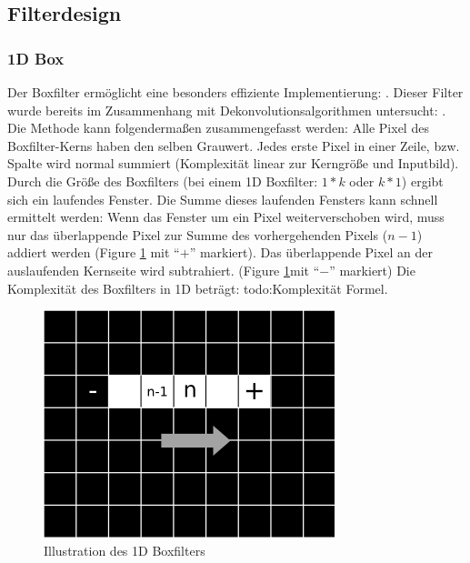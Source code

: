 \documentclass[a4paper,12pt]{article}
\begin{document}
\newpage

\subsection{Filterdesign}\label{chp:filterdesign}
\subsubsection{1D Box}\label{chp:1dBox}
Der Boxfilter ermöglicht eine besonders effiziente Implementierung:
\cite{mcdonnell}. Dieser Filter wurde bereits im Zusammenhang
mit Dekonvolutionsalgorithmen untersucht: \cite{vimpaper}.
Die Methode kann folgendermaßen zusammengefasst werden:
Alle Pixel des Boxfilter-Kerns haben den selben Grauwert. Jedes erste Pixel in
einer Zeile, bzw. Spalte wird normal summiert (Komplexität linear zur
Kerngröße und Inputbild). Durch die Größe des Boxfilters (bei einem 1D
Boxfilter: $1 \ast k$ oder $k \ast 1$) ergibt sich ein laufendes Fenster. 
Die Summe dieses laufenden Fensters kann schnell ermittelt werden: Wenn das
Fenster um ein Pixel weiterverschoben wird, muss nur das überlappende Pixel zur
Summe des vorhergehenden Pixels ($n-1$) addiert werden (Figure \ref{figure_box}
mit "`$+$"' markiert).
Das überlappende Pixel an der auslaufenden Kernseite wird subtrahiert.
(Figure \ref{figure_box}mit "`$-$"' markiert)
Die Komplexität des Boxfilters in 1D beträgt: todo:Komplexität Formel.
 
  
\begin{figure}[htbp]
\centering
\includegraphics[scale=2.0]{Box1Di.png}
\caption{Illustration des 1D Boxfilters}
\label{figure_box}
\end{figure}
\end{document}
